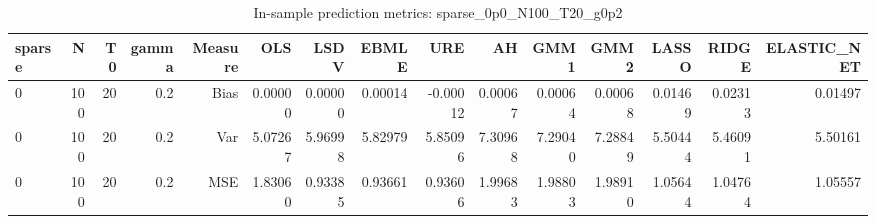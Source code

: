 \begin{table}[!htbp]\centering
\caption{In-sample prediction metrics: sparse_0p0_N100_T20_g0p2}
\label{tab:table2_sparse_0p0_N100_T20_g0p2}
\begin{tabular}{lrrrrrrrrrrrrrr}
\hline
sparse & N & T0 & gamma & Measure & OLS & LSDV & EBMLE & URE & AH & GMM1 & GMM2 & LASSO & RIDGE & ELASTIC_NET \\
\hline
0 & 100 & 20 & 0.2 & Bias & 0.00000 & 0.00000 & 0.00014 & -0.00012 & 0.00067 & 0.00064 & 0.00068 & 0.01469 & 0.02313 & 0.01497 \\
0 & 100 & 20 & 0.2 & Var & 5.07267 & 5.96998 & 5.82979 & 5.85096 & 7.30968 & 7.29040 & 7.28849 & 5.50444 & 5.46091 & 5.50161 \\
0 & 100 & 20 & 0.2 & MSE & 1.83060 & 0.93385 & 0.93661 & 0.93606 & 1.99683 & 1.98803 & 1.98910 & 1.05644 & 1.04764 & 1.05557 \\
\hline
\end{tabular}
\end{table}

